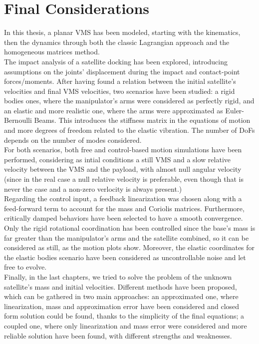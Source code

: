 \documentclass[a4paper,12pt,oneside]{report}
\begin{document}
\section{Final Considerations}
In this thesis, a planar VMS has been modeled, starting with the kinematics, then the dynamics through both the classic Lagrangian approach and the homogeneous matrices method.\\
The impact analysis of a satellite docking has been explored, introducing assumptions on the joints' displacement during the impact and contact-point forces/moments. After having found a relation between the initial satellite's velocities and final VMS velocities, two scenarios have been studied: a rigid bodies ones, where the manipulator's arms were considered as perfectly rigid, and an elastic and more realistic one, where the arms were approximated as Euler-Bernoulli Beams. This introduces the stiffness matrix in the equations of motion and more degrees of freedom related to the elastic vibration. The number of DoFs depends on the number of modes considered.\\
For both scenarios, both free and control-based motion simulations have been performed, considering as intial conditions a still VMS and a slow relative velocity between the VMS and the payload, with almost null angular velocity (since in the real case a null relative velocity is preferable, even though that is never the case and a non-zero verlocity is always present.)\\
Regarding the control input, a feedback linearization was chosen along with a feed-forward term to account for the mass and Coriolis matrices. Furthermore, critically damped behaviors have been selected to have a smooth convergence.\\
Only the rigid rotational coordination has been controlled since the base's mass is far greater than the manipulator's arms and the satellite combined, so it can be considered as still, as the motion plots show. Moreover, the elastic coordinates for the elastic bodies scenario have been considered as uncontrollable noise and let free to evolve.\\
Finally, in the last chapters, we tried to solve the problem of the unknown satellite's mass and initial velocities. Different methods have been proposed, which can be gathered in two main approaches: an approximated one, where linearization, mass and approximation error have been considered and closed form solution could be found, thanks to the simplicity of the final equations; a coupled one, where only linearization and mass error were considered and more reliable solution have been found, with different strengths and weaknesses.\\
\end{document}
